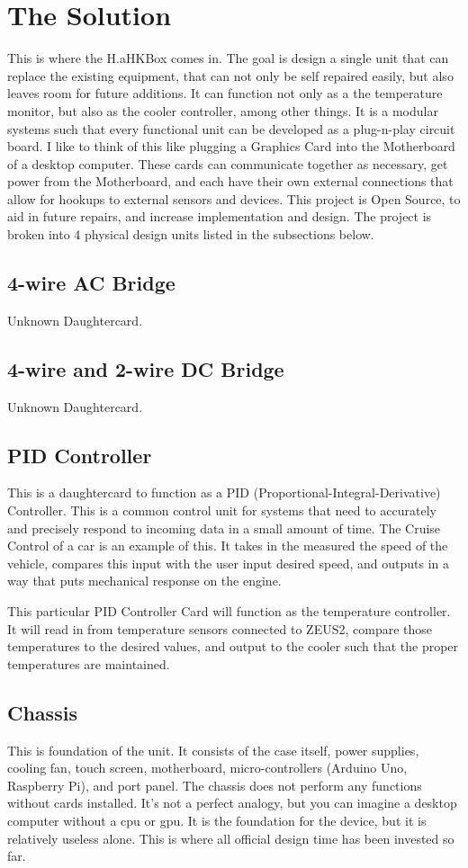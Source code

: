 \documentclass[prb,preprint]{revtex4-1}
\begin{document}
\section{The Solution}
This is where the H.aHKBox comes in. The goal is design a single unit that can replace the existing equipment, that can not only be self repaired easily, but also leaves room for future additions. It can function not only as a the temperature monitor, but also as the cooler controller, among other things. It is a modular systems such that every functional unit can be developed as a plug-n-play circuit board. I like to think of this like plugging a Graphics Card into the Motherboard of a desktop computer. These cards can communicate together as necessary, get power from the Motherboard, and each have their own external connections that allow for hookups to external sensors and devices. This project is Open Source, to aid in future repairs, and increase implementation and design. The project is broken into 4 physical design units listed in the subsections below.

\subsection{4-wire AC Bridge}
Unknown Daughtercard.

\subsection{4-wire and 2-wire DC Bridge}
Unknown Daughtercard.

\subsection{PID Controller}
This is a daughtercard to function as a PID (Proportional-Integral-Derivative) Controller. This is a common control unit for systems that need to accurately and precisely respond to incoming data in a small amount of time. The Cruise Control of a car is an example of this. It takes in the measured the speed of the vehicle, compares this input with the user input desired speed, and outputs in a way that puts mechanical response on the engine.

This particular PID Controller Card will function as the temperature controller. It will read in from temperature sensors connected to ZEUS2, compare those temperatures to the desired values, and output to the cooler such that the proper temperatures are maintained. 

\subsection{Chassis}
This is foundation of the unit. It consists of the case itself, power supplies, cooling fan, touch screen, motherboard, micro-controllers (Arduino Uno, Raspberry Pi), and port panel. The chassis does not perform any functions without cards installed. It's not a perfect analogy, but you can imagine a desktop computer without a cpu or gpu. It is the foundation for the device, but it is relatively useless alone. This is where all official design time has been invested so far.
\end{document}
